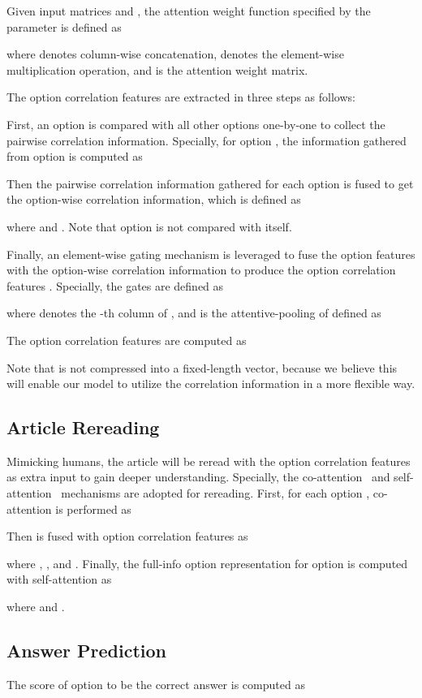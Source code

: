 \documentclass[11pt,a4paper]{article}
\begin{document}
Given input matrices  and , the attention weight function  specified by the parameter  is defined as

where  denotes column-wise concatenation,  denotes the element-wise multiplication operation, and  is the attention weight matrix.

The option correlation features are extracted in three steps as follows:

First, an option is compared with all other options one-by-one to collect the pairwise correlation information. Specially, for option , the information  gathered from option  is computed as


Then the pairwise correlation information gathered for each option is fused to get the option-wise correlation information, which is defined as

where  and . Note that option  is not compared with itself. 

Finally, an element-wise gating mechanism is leveraged to fuse the option features with the option-wise correlation information to produce the option correlation features . Specially, the gates  are defined as

where  denotes the -th column of , and  is the attentive-pooling of  defined as

The option correlation features  are computed as

Note that  is not compressed into a fixed-length vector, because we believe this will enable our model to utilize the correlation information in a more flexible way.

\subsection{Article Rereading}
\label{sec:rereading}
Mimicking humans, the article will be reread with the option correlation features as extra input to gain deeper understanding. Specially, the co-attention~\cite{DCN} and self-attention~\cite{r-net} mechanisms are adopted for rereading.
First, for each option , co-attention is performed as

Then  is fused with option correlation features  as

where , , and .
Finally, the full-info option representation  for option  is computed with self-attention as

where  and .

\subsection{Answer Prediction}
\label{sec:prediction}
The score  of option  to be the correct answer is computed as
\end{document}
